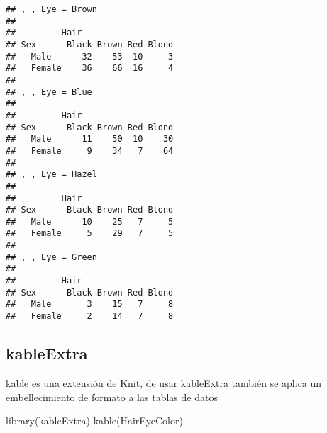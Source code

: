 \documentclass[
]{article}
\newenvironment{Shaded}{\begin{snugshade}}{\end{snugshade}}
\newcommand{\FunctionTok}[1]{\textcolor[rgb]{0.00,0.00,0.00}{#1}}
\newcommand{\NormalTok}[1]{#1}
\begin{document}
\begin{verbatim}
## , , Eye = Brown
## 
##         Hair
## Sex      Black Brown Red Blond
##   Male      32    53  10     3
##   Female    36    66  16     4
## 
## , , Eye = Blue
## 
##         Hair
## Sex      Black Brown Red Blond
##   Male      11    50  10    30
##   Female     9    34   7    64
## 
## , , Eye = Hazel
## 
##         Hair
## Sex      Black Brown Red Blond
##   Male      10    25   7     5
##   Female     5    29   7     5
## 
## , , Eye = Green
## 
##         Hair
## Sex      Black Brown Red Blond
##   Male       3    15   7     8
##   Female     2    14   7     8
\end{verbatim}

\hypertarget{kableextra}{%
\subsection{kableExtra}\label{kableextra}}

kable es una extensión de Knit, de usar kableExtra también se aplica un
embellecimiento de formato a las tablas de datos

\begin{Shaded}
\begin{Highlighting}[]
\FunctionTok{library}\NormalTok{(kableExtra)}
\FunctionTok{kable}\NormalTok{(HairEyeColor)}
\end{Highlighting}
\end{Shaded}
\end{document}
